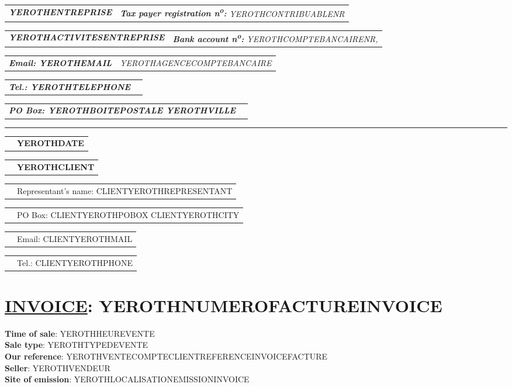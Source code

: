 \documentclass[10pt,YEROTHPAPERSPEC]{article} %
\makeatletter
\newcommand{\headerrow}[2]
{\begin{tabular*}{\linewidth}{l@{\extracolsep{\fill}}r}
	#1 &
	#2 \\
\end{tabular*}}
\newcommand{\emphbold}[1]{\textbf{\emph{#1}}\xspace}
\makeatother
\begin{document}
\bigskip

\headerrow
	{\emphbold{YEROTHENTREPRISE}}
	{\emph{\textbf{Tax payer registration n\textsuperscript{o}:} YEROTHCONTRIBUABLENR}}
\headerrow
	{\emphbold{YEROTHACTIVITESENTREPRISE}}
	{\emph{\textbf{Bank account n\textsuperscript{o}:} YEROTHCOMPTEBANCAIRENR,}}
\headerrow
	{\emphbold{Email: YEROTHEMAIL}}
	{\emph{YEROTHAGENCECOMPTEBANCAIRE}}
\headerrow
	{\emphbold{Tel.: YEROTHTELEPHONE}}
	{}
\headerrow
	{\emphbold{PO Box: YEROTHBOITEPOSTALE YEROTHVILLE}}
	{}
	
\hrule

\headerrow
	{}
	{\textbf{YEROTHDATE}}

\vspace*{0.9cm}

\headerrow
{}
{\textbf{YEROTHCLIENT}}
\headerrow
{}
{Representant's name: CLIENTYEROTHREPRESENTANT}
\headerrow
{}
{PO Box: CLIENTYEROTHPOBOX CLIENTYEROTHCITY}
\headerrow
{}
{Email: CLIENTYEROTHMAIL}
\headerrow
{}
{Tel.: CLIENTYEROTHPHONE}

\section*{\underline{INVOICE}: YEROTHNUMEROFACTUREINVOICE}
\textbf{Time of sale}: YEROTHHEUREVENTE\\
\textbf{Sale type}: YEROTHTYPEDEVENTE\\
\textbf{Our reference}: YEROTHVENTECOMPTECLIENTREFERENCEINVOICEFACTURE\\
\textbf{Seller}: YEROTHVENDEUR\\
\textbf{Site of emission}: YEROTHLOCALISATIONEMISSIONINVOICE

\vspace{0.3cm} 

\begin{table*}[!htbp]
\end{table*}
\end{document}
